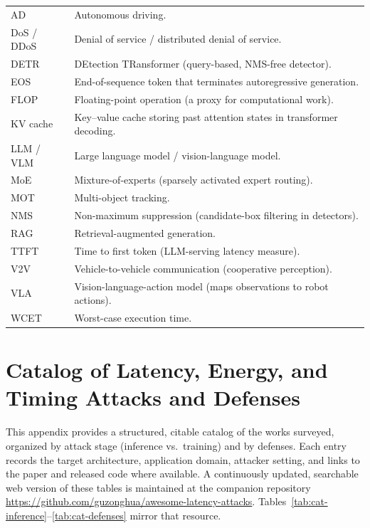\documentclass[acmsmall,screen,review,nonacm]{acmart}
\begin{document}
\begin{table}[htbp]
\begin{tabularx}{\linewidth}{l X}
    \addlinespace[2pt]
    AD & Autonomous driving. \\
    DoS / DDoS & Denial of service / distributed denial of service. \\
    DETR & DEtection TRansformer (query-based, NMS-free detector). \\
    EOS & End-of-sequence token that terminates autoregressive generation. \\
    FLOP & Floating-point operation (a proxy for computational work). \\
    KV cache & Key--value cache storing past attention states in transformer decoding. \\
    LLM / VLM & Large language model / vision-language model. \\
    MoE & Mixture-of-experts (sparsely activated expert routing). \\
    MOT & Multi-object tracking. \\
    NMS & Non-maximum suppression (candidate-box filtering in detectors). \\
    RAG & Retrieval-augmented generation. \\
    TTFT & Time to first token (LLM-serving latency measure). \\
    V2V & Vehicle-to-vehicle communication (cooperative perception). \\
    VLA & Vision-language-action model (maps observations to robot actions). \\
    WCET & Worst-case execution time. \\
    \bottomrule
  \end{tabularx}
\end{table}

\section{Catalog of Latency, Energy, and Timing Attacks and Defenses}
\label{sec:appendix}

This appendix provides a structured, citable catalog of the works surveyed, organized by attack stage (inference vs.\ training) and by defenses. Each entry records the target architecture, application domain, attacker setting, and links to the paper and released code where available. A continuously updated, searchable web version of these tables is maintained at the companion repository \url{https://github.com/guzonghua/awesome-latency-attacks}. Tables~\ref{tab:cat-inference}--\ref{tab:cat-defenses} mirror that resource.
\end{document}

